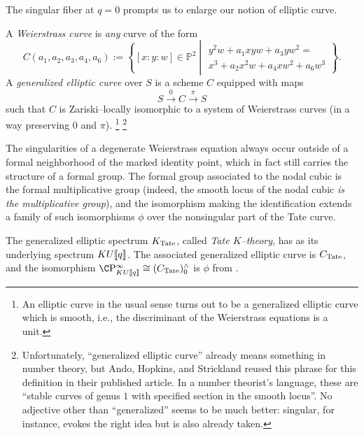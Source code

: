 The singular fiber at \(q = 0\) prompts us to enlarge our notion of elliptic curve.

\begin{definition}
A \textit{Weierstrass curve} is \emph{any} curve of the form \[C(a_1, a_2, a_3, a_4, a_6) := \left\{ [x : y : w] \in \mathbb P^2 \middle| \begin{array}{c} y^2 w + a_1 xyw + a_3 yw^2 = \\ x^3 + a_2 x^2 w + a_4 x w^2 + a_6 w^3 \end{array} \right\}.\]
A \textit{generalized elliptic curve} over \(S\) is a scheme \(C\) equipped with maps \[S \xrightarrow{0} C \xrightarrow{\pi} S\] such that \(C\) is Zariski--locally isomorphic to a system of Weierstrass curves (in a way preserving \(0\) and \(\pi\)).%
\footnote{%
An elliptic curve in the usual sense turns out to be a generalized elliptic curve which is smooth, i.e., the discriminant of the Weierstrass equations is a unit.
}%
\footnote{%
Unfortunately, ``generalized elliptic curve'' already means something in number theory, but Ando, Hopkins, and Strickland reused this phrase for this definition in their published article.
In a number theorist's language, these are ``stable curves of genus \(1\) with specified section in the smooth locus''.
No adjective other than ``generalized'' seems to be much better: singular, for instance, evokes the right idea but is also already taken.
}
\end{definition}

\begin{remark}\label{NodalCubicGivesGm}
The singularities of a degenerate Weierstrass equation always occur outside of a formal neighborhood of the marked identity point, which in fact still carries the structure of a formal group.
The formal group associated to the nodal cubic is the formal multiplicative group (indeed, the smooth locus of the nodal cubic \emph{is the multiplicative group}), and the isomorphism making the identification extends a family of such isomorphisms \(\phi\) over the nonsingular part of the Tate curve.
\end{remark}

\begin{definition}\label{TateKTheoryDefn}
The generalized elliptic spectrum \(K_{\mathrm{Tate}}\), called \textit{Tate \(K\)--theory}, has as its underlying spectrum \(KU\llbracket{q}\rrbracket\).
The associated generalized elliptic curve is \(C_{\mathrm{Tate}}\), and the isomorphism \(\CP^\infty_{KU\ps{q}} \cong (C_{\Tate})^\wedge_0\) is \(\phi\) from .
\end{definition}

